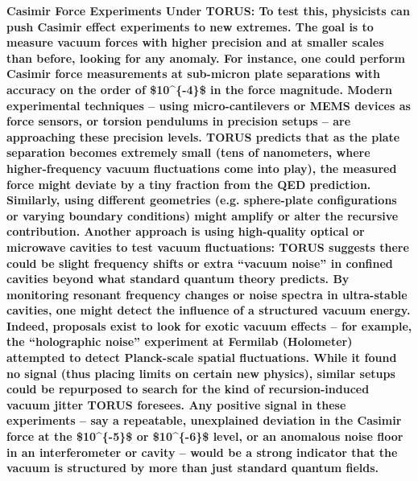 \documentclass[]{article}
\begin{document}
\textbf{Casimir Force Experiments Under TORUS: To test this, physicists
can push Casimir effect experiments to new extremes. The goal is to
measure vacuum forces with higher precision and at smaller scales than
before, looking for any anomaly. For instance, one could perform Casimir
force measurements at sub-micron plate separations with accuracy on the
order of \$10\^{}\{-4\}\$ in the force magnitude. Modern experimental
techniques -- using micro-cantilevers or MEMS devices as force sensors,
or torsion pendulums in precision setups -- are approaching these
precision levels. TORUS predicts that as the plate separation becomes
extremely small (tens of nanometers, where higher-frequency vacuum
fluctuations come into play), the measured force might deviate by a tiny
fraction from the QED prediction. Similarly, using different geometries
(e.g. sphere-plate configurations or varying boundary conditions) might
amplify or alter the recursive contribution. Another approach is using
high-quality optical or microwave cavities to test vacuum fluctuations:
TORUS suggests there could be slight frequency shifts or extra ``vacuum
noise'' in confined cavities beyond what standard quantum theory
predicts. By monitoring resonant frequency changes or noise spectra in
ultra-stable cavities, one might detect the influence of a structured
vacuum energy. Indeed, proposals exist to look for exotic vacuum effects
-- for example, the ``holographic noise'' experiment at Fermilab
(Holometer) attempted to detect Planck-scale spatial fluctuations. While
it found no signal (thus placing limits on certain new physics), similar
setups could be repurposed to search for the kind of recursion-induced
vacuum jitter TORUS foresees. Any positive signal in these experiments
-- say a repeatable, unexplained deviation in the Casimir force at the
\$10\^{}\{-5\}\$ or \$10\^{}\{-6\}\$ level, or an anomalous noise floor
in an interferometer or cavity -- would be a strong indicator that the
vacuum is structured by more than just standard quantum fields.}
\end{document}
